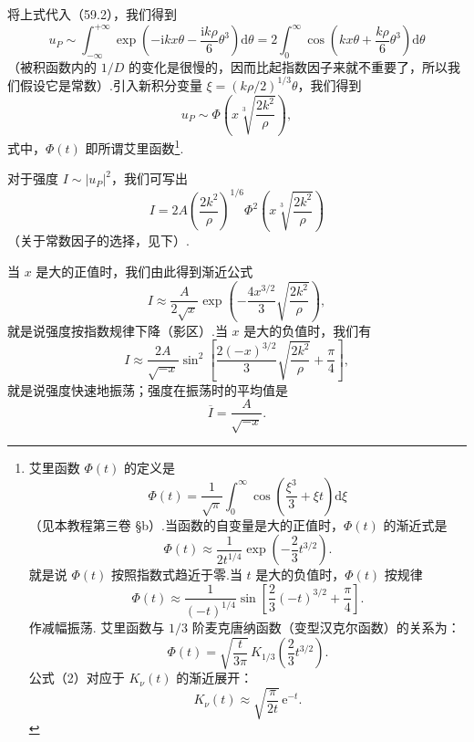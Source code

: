\begin{xiti}
将上式代入（59.2），我们得到
\begin{equation*}
  u_P\sim\int_{-\infty}^{+\infty}
  \exp\left(-\mathrm{i}kx\theta-\frac{\mathrm{i}k\rho}{6}\theta^3\right)\mathrm{d}\theta
  =2\int_0^{\infty}\cos\left(kx\theta+\frac{k\rho}{6}\theta^3\right)\mathrm{d}\theta
\end{equation*}
（被积函数内的 $1/D$ 的变化是很慢的，因而比起指数因子来就不重要了，所以我们假设它是常数）.引入新积分变量 $\xi=(k\rho/2)^{1/3}\theta$，我们得到
\begin{equation*}
  u_P\sim\Phi\left(x\sqrt[3]{\frac{2k^2}{\rho}}\right),
\end{equation*}
式中，$\Phi(t)$ 即所谓艾里函数\footnote{艾里函数 $\Phi(t)$ 的定义是
\begin{equation*}\tag{1}
  \Phi(t)=\frac{1}{\sqrt{\pi}}\int_0^{\infty}\cos\left(\frac{\xi^3}{3}+\xi t\right)\mathrm{d}\xi
\end{equation*}
（见本教程第三卷 §b）.当函数的自变量是大的正值时，$\Phi(t)$ 的渐近式是
\begin{equation*}\tag{2}
  \Phi(t)\approx\frac{1}{2t^{1/4}}\exp\left(-\frac{2}{3}t^{3/2}\right).
\end{equation*}
就是说 $\Phi(t)$ 按照指数式趋近于零.当 $t$ 是大的负值时，$\Phi(t)$ 按规律
\begin{equation*}\tag{3}
  \Phi(t)\approx\frac{1}{(-t)^{1/4}}\sin\left[\frac{2}{3}(-t)^{3/2}+\frac{\pi}{4}\right].
\end{equation*}
作减幅振荡.
艾里函数与 $1/3$ 阶麦克唐纳函数（变型汉克尔函数）的关系为：
\begin{equation*}\tag{4}
  \Phi(t)=\sqrt{\frac{t}{3\pi}}\,K_{1/3}\left(\frac{2}{3}t^{3/2}\right).
\end{equation*}
公式（2）对应于 $K_\nu(t)$ 的渐近展开：
\begin{equation*}
  K_\nu(t)\approx\sqrt{\frac{\pi}{2t}}\,\mathrm{e}^{-t}.
\end{equation*}}.


对于强度 $I\sim|u_P|^2$，我们可写出
\begin{equation*}
  I=2A\left(\frac{2k^2}{\rho}\right)^{1/6}
  \Phi^2\left(x\sqrt[3]{\frac{2k^2}{\rho}}\right)
\end{equation*}
（关于常数因子的选择，见下）.

当 $x$ 是大的正值时，我们由此得到渐近公式
\begin{equation*}
  I\approx\frac{A}{2\sqrt{x}}
  \exp\left(-\frac{4x^{3/2}}{3}\sqrt{\frac{2k^2}{\rho}}\right),
\end{equation*}
就是说强度按指数规律下降（影区）.当 $x$ 是大的负值时，我们有
\begin{equation*}
  I\approx\frac{2A}{\sqrt{-x}}
  \sin^2\left[\frac{2(-x)^{3/2}}{3}\sqrt{\frac{2k^2}{\rho}}
  +\frac{\pi}{4}\right],
\end{equation*}
就是说强度快速地振荡；强度在振荡时的平均值是
\begin{equation*}
  \overline{I}=\frac{A}{\sqrt{-x}}.
\end{equation*}


\end{xiti}
